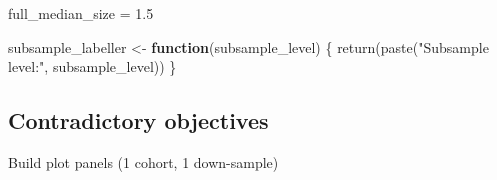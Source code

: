 \documentclass[
]{book}
\newenvironment{Shaded}{\begin{snugshade}}{\end{snugshade}}
\newcommand{\ControlFlowTok}[1]{\textcolor[rgb]{0.13,0.29,0.53}{\textbf{#1}}}
\newcommand{\FloatTok}[1]{\textcolor[rgb]{0.00,0.00,0.81}{#1}}
\newcommand{\FunctionTok}[1]{\textcolor[rgb]{0.00,0.00,0.00}{#1}}
\newcommand{\NormalTok}[1]{#1}
\newcommand{\OtherTok}[1]{\textcolor[rgb]{0.56,0.35,0.01}{#1}}
\newcommand{\StringTok}[1]{\textcolor[rgb]{0.31,0.60,0.02}{#1}}
\begin{document}
\begin{Shaded}
\begin{Highlighting}[]
\NormalTok{full\_median\_size }\OtherTok{=} \FloatTok{1.5}

\NormalTok{subsample\_labeller }\OtherTok{\textless{}{-}} \ControlFlowTok{function}\NormalTok{(subsample\_level) \{}
  \FunctionTok{return}\NormalTok{(}\FunctionTok{paste}\NormalTok{(}\StringTok{"Subsample level:"}\NormalTok{, subsample\_level))}
\NormalTok{\}}
\end{Highlighting}
\end{Shaded}

\hypertarget{contradictory-objectives}{%
\subsection{Contradictory objectives}\label{contradictory-objectives}}

Build plot panels (1 cohort, 1 down-sample)
\end{document}
